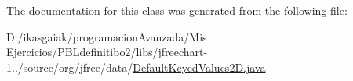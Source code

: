 The documentation for this class was generated from the following file\+:\begin{DoxyCompactItemize}
\item 
D\+:/ikasgaiak/programacion\+Avanzada/\+Mis Ejercicios/\+P\+B\+Ldefinitibo2/libs/jfreechart-\/1../source/org/jfree/data/\mbox{\hyperlink{_default_keyed_values2_d_8java}{Default\+Keyed\+Values2\+D.\+java}}\end{DoxyCompactItemize}
